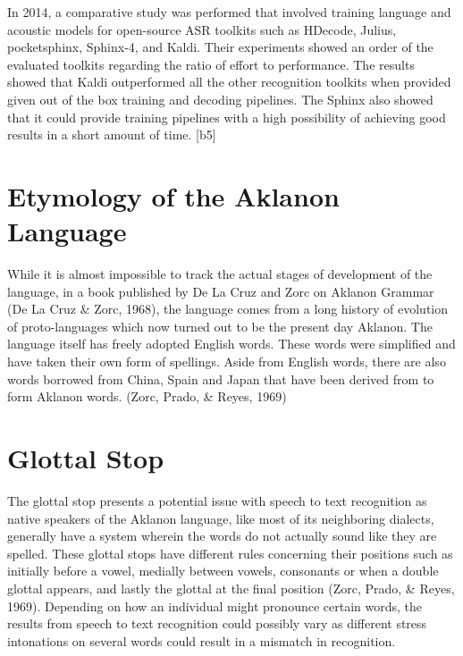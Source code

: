 In 2014, a comparative study was performed that involved training language and acoustic models for open-source ASR toolkits such as HDecode, Julius, pocketsphinx, Sphinx-4, and Kaldi. Their experiments showed an order of the evaluated toolkits regarding the ratio of effort to performance. The results showed that Kaldi outperformed all the other recognition toolkits when provided given out of the box training and decoding pipelines. The Sphinx also showed that it could provide training pipelines with a high possibility of achieving good results in a short amount of time.  [b5]


\section{Etymology of the Aklanon Language}

While it is almost impossible to track the actual stages of development of the language, in a book published by De La Cruz and Zorc on Aklanon Grammar (De La Cruz \& Zorc, 1968), the language comes from a long history of evolution of proto-languages which now turned out to be the present day Aklanon. The language itself has freely adopted English words. These words were simplified and have taken their own form of spellings. Aside from English words, there are also words borrowed from China, Spain and Japan that have been derived from to form Aklanon words. (Zorc, Prado, \& Reyes, 1969)

\section{Glottal Stop}

The glottal stop presents a potential issue with speech to text recognition as native speakers of the Aklanon language, like most of its neighboring dialects, generally have a system wherein the words do not actually sound like they are spelled. These glottal stops have different rules concerning their positions such as initially before a vowel, medially between vowels, consonants or when a double glottal appears, and lastly the glottal at the final position (Zorc, Prado, \& Reyes, 1969). Depending on how an individual might pronounce certain words, the results from speech to text recognition could possibly vary as different stress intonations on several words could result in a mismatch in recognition.